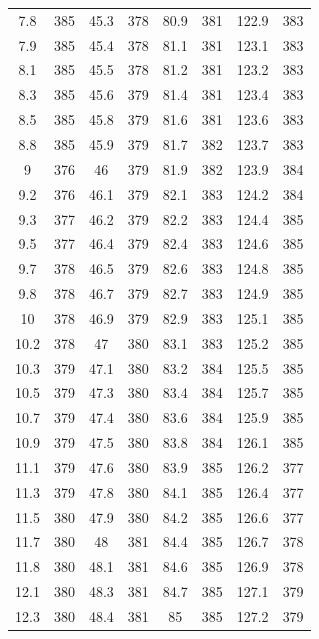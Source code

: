 \documentclass[12pt]{ctexart}
\numberwithin{equation}{section}
\begin{document}
\begin{longtable}{cc|cc|cc|cc}
7.8  &  385  &  45.3  &  378  &  80.9  &  381  &  122.9  &  383  \\
7.9  &  385  &  45.4  &  378  &  81.1  &  381  &  123.1  &  383  \\
8.1  &  385  &  45.5  &  378  &  81.2  &  381  &  123.2  &  383  \\
8.3  &  385  &  45.6  &  379  &  81.4  &  381  &  123.4  &  383  \\
8.5  &  385  &  45.8  &  379  &  81.6  &  381  &  123.6  &  383  \\
8.8  &  385  &  45.9  &  379  &  81.7  &  382  &  123.7  &  383  \\
9  &  376  &  46  &  379  &  81.9  &  382  &  123.9  &  384  \\
9.2  &  376  &  46.1  &  379  &  82.1  &  383  &  124.2  &  384  \\
9.3  &  377  &  46.2  &  379  &  82.2  &  383  &  124.4  &  385  \\
9.5  &  377  &  46.4  &  379  &  82.4  &  383  &  124.6  &  385  \\
9.7  &  378  &  46.5  &  379  &  82.6  &  383  &  124.8  &  385  \\
9.8  &  378  &  46.7  &  379  &  82.7  &  383  &  124.9  &  385  \\
10  &  378  &  46.9  &  379  &  82.9  &  383  &  125.1  &  385  \\
10.2  &  378  &  47  &  380  &  83.1  &  383  &  125.2  &  385  \\
10.3  &  379  &  47.1  &  380  &  83.2  &  384  &  125.5  &  385  \\
10.5  &  379  &  47.3  &  380  &  83.4  &  384  &  125.7  &  385  \\
10.7  &  379  &  47.4  &  380  &  83.6  &  384  &  125.9  &  385  \\
10.9  &  379  &  47.5  &  380  &  83.8  &  384  &  126.1  &  385  \\
11.1  &  379  &  47.6  &  380  &  83.9  &  385  &  126.2  &  377  \\
11.3  &  379  &  47.8  &  380  &  84.1  &  385  &  126.4  &  377  \\
11.5  &  380  &  47.9  &  380  &  84.2  &  385  &  126.6  &  377  \\
11.7  &  380  &  48  &  381  &  84.4  &  385  &  126.7  &  378  \\
11.8  &  380  &  48.1  &  381  &  84.6  &  385  &  126.9  &  378  \\
12.1  &  380  &  48.3  &  381  &  84.7  &  385  &  127.1  &  379  \\
12.3  &  380  &  48.4  &  381  &  85  &  385  &  127.2  &  379  \\

\end{longtable}
\end{document}
